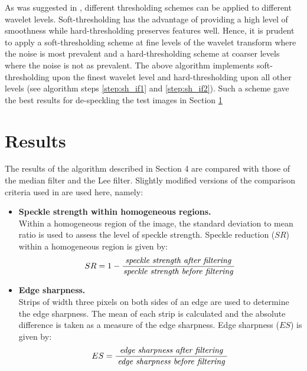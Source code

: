 \documentclass[twocolumn]{article}
\begin{document}
As was suggested in \cite{zong98},
different thresholding schemes can be applied to different wavelet levels. 
Soft-thresholding has the advantage of providing a high level of smoothness while hard-thresholding
preserves features well. Hence, it is prudent to apply a soft-thresholding scheme at fine levels
of the wavelet transform where the noise is most prevalent and a hard-thresholding scheme at coarser levels where the 
noise is not as prevalent. 
The above algorithm implements soft-thresholding upon the finest wavelet level and hard-thresholding upon all other levels
(see algorithm steps \ref{step:sh_if1} and \ref{step:sh_if2}). Such a scheme gave the best results for de-speckling 
the test images in Section \ref{sec:results}

\section{Results}
\label{sec:results}

The results of the algorithm described in Section 4 are compared with those of 
the median filter and the Lee filter. 
Slightly modified versions of the comparison criteria  
used in \cite{lee94,yu96} are used here, namely: 
\begin{itemize}
	\item {\bf Speckle strength within homogeneous regions.} \\
	Within a homogeneous region of the image, the standard deviation to mean ratio 
	is used to assess the level of speckle strength.
	Speckle reduction ($SR$) within a homogeneous region is given by:
	\begin{equation}
		SR = 1 - \frac	{\parbox[h]{4.75cm}{\centering \emph{speckle~strength~after~filtering}}}
				{\parbox[h]{4.75cm}{\centering \emph{speckle~strength~before~filtering}}}
	\end{equation}

	\item {\bf Edge sharpness.} \\
	Strips of width three pixels on both sides of an edge are used to determine 
	the edge sharpness. The mean of each strip is calculated and the
	absolute difference is taken as a measure of the edge sharpness.
	Edge sharpness ($ES$) is given by:
	\begin{equation}
		ES = \frac	{\parbox[h]{4.75cm}{\centering \emph{edge~sharpness~after~filtering}}}
				{\parbox[h]{4.75cm}{\centering \emph{edge~sharpness~before~filtering}}}
	\end{equation}
\end{itemize}
\end{document}
